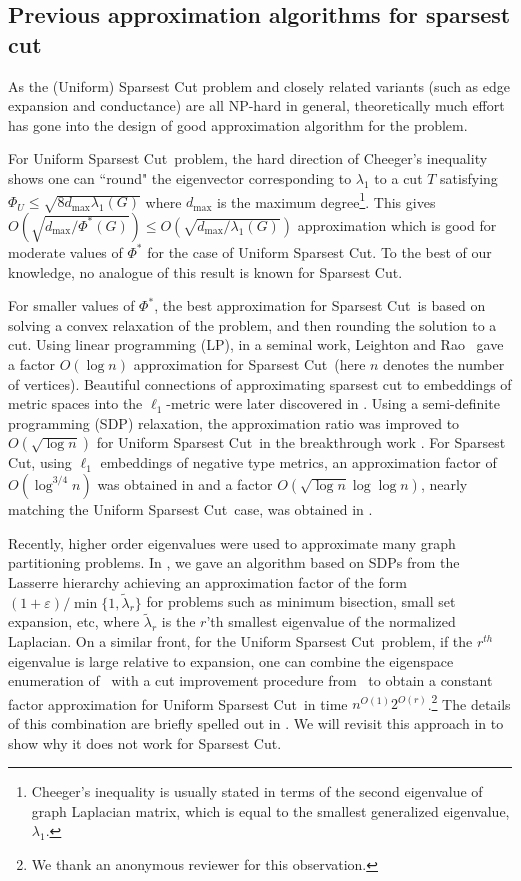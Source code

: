 \documentclass{article}
\let\eps=\varepsilon
\newcommand{\usc}{\textsc{\sf Uniform Sparsest Cut}}
\newcommand{\nusc}{\textsc{\sf Non-Uniform Sparsest Cut}}
\newcounter{alg-count}
\renewcommand{\nusc}{{\sc Sparsest Cut}}
\renewcommand{\usc}{{\sc Uniform Sparsest Cut}}
\begin{document}
\subsection{Previous approximation algorithms for sparsest cut}
\label{sec:related-work}
As the {\sc (Uniform) Sparsest Cut} problem and closely related
variants (such as edge expansion and conductance) are all NP-hard in
general, theoretically much effort has gone into the design of good
approximation algorithm for the problem.

For \usc\ problem, the hard direction of Cheeger's inequality shows
one can ``round" the eigenvector corresponding to $\lambda_1$ to a cut
$T$ satisfying $\Phi_U \le \sqrt{8 d_{\max} \lambda_1(G)}$ where
$d_{\max}$ is the maximum degree\footnote{Cheeger's inequality is
  usually stated in terms of the second eigenvalue of graph Laplacian
  matrix, which is equal to the smallest generalized eigenvalue,
  $\lambda_1$.}.
This gives $O(\sqrt{d_{\max}/\Phi^\ast(G)}) \le
O(\sqrt{d_{\max}/\lambda_1(G)})$ approximation which is good for
moderate values of $\Phi^\ast$ for the case of \usc. To the best of
our knowledge, no analogue of this result is known for \nusc.

For smaller values of $\Phi^\ast$, the best approximation for \nusc\
is based on solving a convex relaxation of the problem, and then
rounding the solution to a cut. Using linear programming (LP), in a
seminal work, Leighton and Rao~\cite{LR} gave a factor $O(\log n)$
approximation for \nusc\ (here $n$ denotes the number of
vertices). Beautiful connections of approximating sparsest cut to
embeddings of metric spaces into the $\ell_1$-metric were later
discovered in \cite{llr,ar}.  Using a semi-definite programming (SDP)
relaxation, the approximation ratio was improved to $O(\sqrt{\log n})$
for \usc \ in the breakthrough work \cite{ARV}. For \nusc, using
$\ell_1$ embeddings of negative type metrics, an approximation factor
of $O(\log^{3/4} n)$ was obtained in \cite{CGR} and a factor
${O}(\sqrt{\log n} \log\log n)$, nearly matching the \usc \ case, was
obtained in \cite{ALN}.

Recently, higher order eigenvalues were used to approximate many graph
partitioning problems. In \cite{gs11-qip}, we gave an algorithm based
on SDPs from the Lasserre hierarchy achieving an approximation factor
of the form $(1+\eps)/\min\{1,\tilde{\lambda}_r\}$ for problems such
as minimum bisection, small set expansion, etc, where
$\tilde{\lambda}_r$ is the $r$'th smallest eigenvalue of the
normalized Laplacian.  On a similar front, for the \usc\ problem, if
the $r^{th}$ eigenvalue is large relative to expansion, one can
combine the eigenspace enumeration of~\cite{ABS} with a cut
improvement procedure
from~\cite{al08} to obtain a constant factor approximation for \usc\ in time $n^{O(1)}
2^{O(r)}$.\footnote{We thank an anonymous reviewer for this
  observation.}  The details of this combination are briefly spelled
out in \Cref{apx:rse}. We will revisit this approach in
 to show why it does not work for \nusc.
\end{document}
